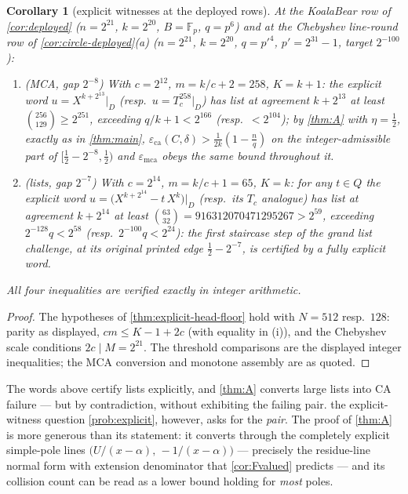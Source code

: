 \documentclass[11pt]{article}
\newtheorem{corollary}[corollary]{Corollary}
\theoremstyle{definition}
\theoremstyle{remark}
\newcommand{\F}{\mathbb{F}}
\newcommand{\B}{B}
\newcommand{\eca}{\varepsilon_{\mathrm{ca}}}
\newcommand{\emca}{\varepsilon_{\mathrm{mca}}}
\begin{document}
\begin{corollary}[explicit witnesses at the deployed rows]\label{cor:explicit-deployed}
At the KoalaBear row of \cref{cor:deployed} \textup($n=2^{21}$, $k=2^{20}$, $\B=\F_p$, $q=p^6$\textup) and at the Chebyshev line-round row of \cref{cor:circle-deployed}\textup{(a)} \textup($n=2^{21}$, $k=2^{20}$, $q=p'^4$, $p'=2^{31}-1$, target $2^{-100}$\textup):
\begin{enumerate}[label=\textup{(\roman*)}]
\item \textup(MCA, gap $2^{-8}$\textup) With $c=2^{12}$, $m=k/c+2=258$, $K=k+1$: the explicit word $u=X^{k+2^{13}}|_D$ \textup(resp.\ $u=T_c^{258}|_D$\textup) has list at agreement $k+2^{13}$ at least $\binom{256}{129}\ge2^{251}$, exceeding $q/k+1<2^{166}$ \textup(resp.\ $<2^{104}$\textup); by \cref{thm:A} with $\eta=\frac12$, exactly as in \cref{thm:main}, $\eca(C,\delta)>\frac1{2k}(1-\frac nq)$ on the integer-admissible part of $[\frac12-2^{-8},\frac12)$ and $\emca$ obeys the same bound throughout it.
\item \textup(lists, gap $2^{-7}$\textup) With $c=2^{14}$, $m=k/c+1=65$, $K=k$: for any $t\in Q$ the explicit word $u=\bigl(X^{k+2^{14}}-t\,X^{k}\bigr)|_D$ \textup(resp.\ its $T_c$ analogue\textup) has list at agreement $k+2^{14}$ at least $\binom{63}{32}=916312070471295267>2^{59}$, exceeding $2^{-128}q<2^{58}$ \textup(resp.\ $2^{-100}q<2^{24}$\textup): the first staircase step of the grand list challenge, at its original printed edge $\frac12-2^{-7}$, is certified by a fully explicit word.
\end{enumerate}
All four inequalities are verified exactly in integer arithmetic.
\end{corollary}

\begin{proof}
The hypotheses of \cref{thm:explicit-head-floor} hold with $N=512$ resp.\ $128$: parity as displayed, $cm\le K-1+2c$ \textup(with equality in \textup{(i)}\textup), and the Chebyshev scale conditions $2c\mid M=2^{21}$. The threshold comparisons are the displayed integer inequalities; the MCA conversion and monotone assembly are as quoted.
\end{proof}

The words above certify lists explicitly, and \cref{thm:A} converts large lists into CA failure --- but by contradiction, without exhibiting the failing pair. the explicit-witness question \cref{prob:explicit}, however, asks for the \emph{pair}. The proof of \cref{thm:A} is more generous than its statement: it converts through the completely explicit simple-pole lines $\bigl(U/(x-\alpha),\,-1/(x-\alpha)\bigr)$ --- precisely the residue-line normal form with extension denominator that \cref{cor:Fvalued} predicts --- and its collision count can be read as a lower bound holding for \emph{most} poles.
\end{document}
